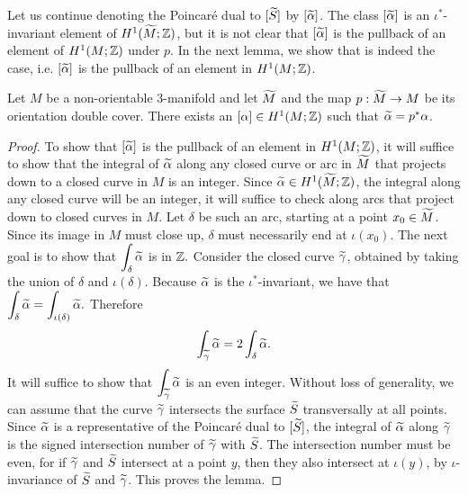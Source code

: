 Let us continue denoting the Poincar\'e dual to $[\widetilde{S}]$ by $[\widetilde{\alpha}]$.  The class $[\widetilde{\alpha}]$ is an $\iota^{\ast}$-invariant element of $H^1(\widetilde{M}; \mathbb{Z})$, but it is not clear that $[\widetilde{\alpha}]$ is the pullback of an element of $H^1(M; \mathbb{Z})$ under $p$.
In the next lemma, we show that is indeed the case, i.e. $[\widetilde{\alpha}]$ is the pullback of an element in $H^1(M; \mathbb{Z})$.
\begin{lem}
  \label{lem:PD2}
  Let $M$ be a non-orientable 3-manifold and let $\widetilde{M}$ and the map $p:\widetilde{M}\to M$ be its orientation double cover.
  There exists an $[\alpha] \in H^1(M; \mathbb{Z})$ such that $\widetilde{\alpha} = p^{\ast} \alpha$.
\end{lem}
\begin{proof}
  To show that $[\widetilde{\alpha}]$ is the pullback of an element in $H^1(M; \mathbb{Z})$, it will suffice to show that the integral of $\widetilde{\alpha}$ along any closed curve or arc in $\widetilde{M}$ that projects down to a closed curve in $M$ is an integer.
  Since $\widetilde{\alpha} \in H^1(\widetilde{M}; \mathbb{Z})$, the integral along any closed curve will be an integer, it will suffice to check along arcs that project down to closed curves in $M$.
  Let $\delta$ be such an arc, starting at a point $x_0 \in \widetilde{M}$.
  Since its image in $M$ must close up, $\delta$ must necessarily end at $\iota(x_0)$.
  The next goal is to show that 
    $\displaystyle\int_{\delta} \widetilde{\alpha}$ is in $\mathbb{Z}.$
  Consider the closed curve $\widetilde{\gamma}$, obtained by taking the union of $\delta$ and $\iota(\delta)$.
  Because $\widetilde{\alpha}$ is the $\iota^{\ast}$-invariant, we have that $ \displaystyle\int_{\delta} \widetilde{\alpha} = \displaystyle\int_{\iota(\delta)} \widetilde{\alpha}.$  Therefore $$\int_{\widetilde{\gamma}}\widetilde{\alpha}=2\int_{\delta}\widetilde{\alpha}.$$ It will suffice to show that $\displaystyle\int_{\widetilde{\gamma}}\widetilde{\alpha}$ is an even integer.
  Without loss of generality, we can assume that the curve $\widetilde{\gamma}$ intersects the surface $\widetilde{S}$ transversally at all points.
  Since $\widetilde{\alpha}$ is a representative of the Poincar\'e dual to $[\widetilde{S}]$, the integral of $\widetilde{\alpha}$ along $\widetilde{\gamma}$ is the signed intersection number of $\widetilde{\gamma}$ with $\widetilde{S}$.
  The intersection number must be even, for if $\widetilde{\gamma}$ and $\widetilde{S}$ intersect at a point $y$, then they also intersect at $\iota(y)$, by $\iota$-invariance of $\widetilde{S}$ and $\widetilde{\gamma}$. This proves the lemma.
\end{proof}
